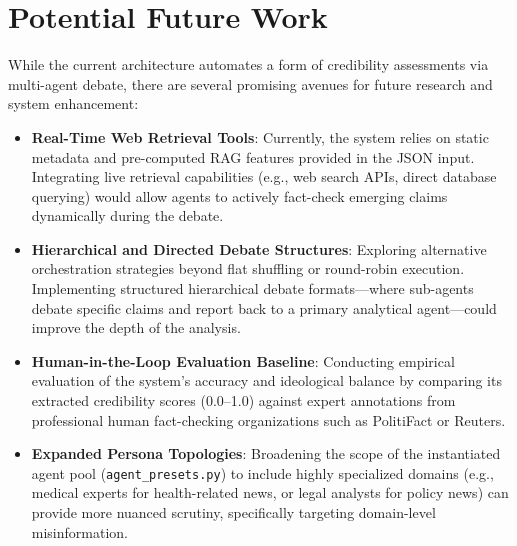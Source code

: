 \documentclass[sigconf,nonacm]{acmart}
\begin{document}
\section{Potential Future Work}\label{sec:future}
While the current architecture automates a form of credibility assessments via multi-agent debate, there are several promising avenues for future research and system enhancement:

\begin{itemize}
    \item \textbf{Real-Time Web Retrieval Tools}: Currently, the system relies on static metadata and pre-computed RAG features provided in the JSON input. Integrating live retrieval capabilities (e.g., web search APIs, direct database querying) would allow agents to actively fact-check emerging claims dynamically during the debate.
    \item \textbf{Hierarchical and Directed Debate Structures}: Exploring alternative orchestration strategies beyond flat shuffling or round-robin execution. Implementing structured hierarchical debate formats—where sub-agents debate specific claims and report back to a primary analytical agent—could improve the depth of the analysis.
    \item \textbf{Human-in-the-Loop Evaluation Baseline}: Conducting empirical evaluation of the system's accuracy and ideological balance by comparing its extracted credibility scores (0.0--1.0) against expert annotations from professional human fact-checking organizations such as PolitiFact or Reuters.
    \item \textbf{Expanded Persona Topologies}: Broadening the scope of the instantiated agent pool (\texttt{agent\_presets.py}) to include highly specialized domains (e.g., medical experts for health-related news, or legal analysts for policy news) can provide more nuanced scrutiny, specifically targeting domain-level misinformation.
\end{itemize}
\end{document}
